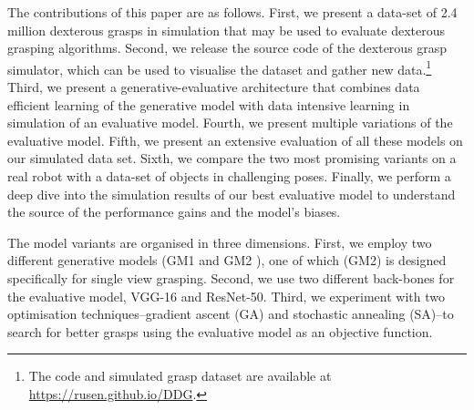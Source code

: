The contributions of this paper are as follows. First, we present a data-set of 2.4 million dexterous grasps in simulation that may be used to evaluate dexterous grasping algorithms. Second, we release the source code of the dexterous grasp simulator, which can be used to visualise the dataset and gather new data.\footnote{The code and simulated grasp dataset are available at \href{https://rusen.github.io/DDG}{https://rusen.github.io/DDG}.} Third, we present a generative-evaluative architecture that combines data efficient learning of the generative model with data intensive learning in simulation of an evaluative model. Fourth, we present multiple variations of the evaluative model. Fifth, we present an extensive evaluation of all these models on our simulated data set. Sixth, we compare the two most promising variants on a real robot with a data-set of objects in challenging poses. Finally, we perform a deep dive into the simulation results of our best evaluative model to understand the source of the performance gains and the model's biases.

The model variants are organised in three dimensions. First, we employ two different generative models (GM1 \cite{kopicki2015ijrr} and GM2 \cite{kopicki2019ijrr}), one of which (GM2) is designed specifically for single view grasping. Second, we use two different back-bones for the evaluative model, VGG-16 and ResNet-50. Third, we experiment with two optimisation techniques--gradient ascent (GA) and stochastic annealing (SA)--to search for better grasps using the evaluative model as an objective function.



